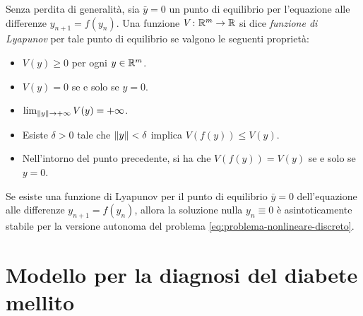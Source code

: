 \begin{defi}
Senza perdita di generalità, sia $\bar{y} = 0$ un punto di equilibrio
per l'equazione alle differenze $y_{n+1} = f(y_n)$. Una funzione
$V \colon \mathbb{R}^m \to \mathbb{R}$ si dice \emph{funzione di Lyapunov}
per tale punto di equilibrio se valgono le seguenti proprietà:
\begin{itemize}
\item $V(y) \geq 0$ per ogni $y \in \mathbb{R}^m$.
\item $V(y) = 0$ se e solo se $y = 0$.
\item $\lim_{\left\lVert y\right\rVert \to +\infty} V(y) = +\infty$.
\item Esiste $\delta > 0$ tale che $\left\lVert y\right\rVert < \delta$ implica $V(f(y)) \leq V(y)$.
\item Nell'intorno del punto precedente, si ha che $V(f(y)) = V(y)$
	se e solo se $y = 0$.
\end{itemize}
\end{defi}

\begin{teor}
Se esiste una funzione di Lyapunov per il punto di equilibrio $\bar{y} = 0$
dell'equazione alle differenze $y_{n+1} = f(y_n)$, allora la soluzione nulla
$y_n \equiv 0$ è asintoticamente stabile per la versione autonoma del
problema \eqref{eq:problema-nonlineare-discreto}.
\end{teor}

\section{Modello per la diagnosi del diabete mellito}

